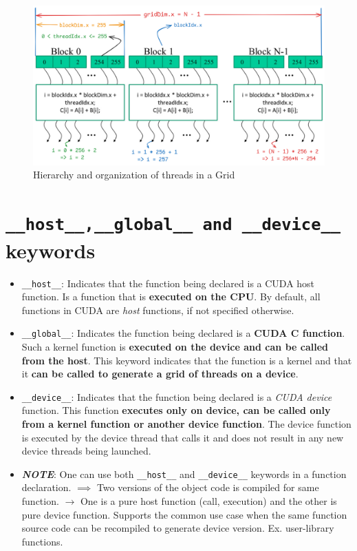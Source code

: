 \begin{itemize}
\begin{figure}[H]
              \includegraphics[width=.85\linewidth]{Images/DP/hierarchy_of_kernel.png}
              \caption{Hierarchy and organization of threads in a Grid}
              \label{fig:dp_hierarchy}
          \end{figure}

\end{itemize}

\section{\texttt{\_\_host\_\_,\_\_global\_\_ and \_\_device\_\_ } keywords}
\begin{itemize}
    \item \texttt{\_\_host\_\_}: Indicates that the function being declared is a CUDA host function. Is a function that is \textbf{executed on the CPU}. By default, all functions in CUDA are \textsl{host} functions, if not specified otherwise.
    \item \texttt{\_\_global\_\_}: Indicates the function being declared is a \textbf{CUDA C function}. Such a kernel function is \textbf{executed on the device and can be called from the host}. This keyword indicates that the function is a kernel and that it \textbf{can be called to generate a grid of threads on a device}.
    \item \texttt{\_\_device\_\_}: Indicates that the function being declared is a \textsl{CUDA device} function. This function \textbf{executes only on device, can be called only from a kernel function or another device function}. The device function is executed by the device thread that calls it and does not result in any new  device threads being launched.
    \item \textbf{\textit{NOTE}}: One can use both  \texttt{\_\_host\_\_} and \texttt{\_\_device\_\_} keywords in a function declaration. $\implies$ Two versions of the object code is compiled for same function. $\rightarrow$ One is a pure host function (call, execution) and the other is pure device function. Supports the common use case when the same function source code can be recompiled to generate device version. Ex. user-library functions.
\end{itemize}

